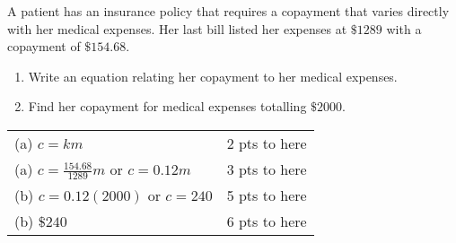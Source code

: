 {
	A patient has an insurance policy that requires a copayment that varies directly with her medical expenses. Her last bill listed her expenses at $\$1289$ with a copayment of $\$154.68$.
	\begin{enumerate}
	\item Write an equation relating her copayment to her medical expenses.
	\item Find her copayment for medical expenses totalling $\$2000$.
	\end{enumerate}
}
{
	\begin{tabular}{l r}
	(a) $c = km$ & 2 pts to here\\
	(a) $c = \frac{154.68}{1289}m$ or $c = 0.12m$ & 3 pts to here\\
	(b) $c = 0.12(2000)$ or $c=240$ & 5 pts to here\\
	(b) $\$240$ & 6 pts to here
	\end{tabular}
}
